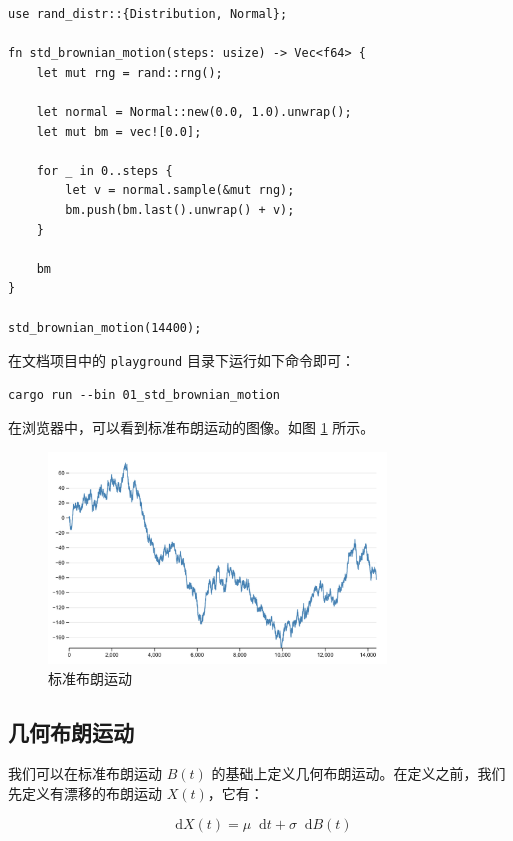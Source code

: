 \documentclass[utf8,a4paper,nofonts,9pt]{ctexbook}
\def\dif{\mathop{}\!\mathrm{d}}
\begin{document}
\begin{lstlisting}
use rand_distr::{Distribution, Normal};

fn std_brownian_motion(steps: usize) -> Vec<f64> {
    let mut rng = rand::rng();

    let normal = Normal::new(0.0, 1.0).unwrap();
    let mut bm = vec![0.0];

    for _ in 0..steps {
        let v = normal.sample(&mut rng);
        bm.push(bm.last().unwrap() + v);
    }

    bm
}

std_brownian_motion(14400);
\end{lstlisting}

在文档项目中的 \verb|playground| 目录下运行如下命令即可：

\begin{lstlisting}
cargo run --bin 01_std_brownian_motion
\end{lstlisting}

在浏览器中，可以看到标准布朗运动的图像。如图 \ref{fig:stdBrownianMotion} 所示。

\begin{figure}[h]
    \centering
    \includegraphics[width=0.8\textwidth]{src/static/00_std_brownian_motion.png}
    \caption{标准布朗运动}
    \label{fig:stdBrownianMotion}
\end{figure}

\subsection[几何布朗运动]{几何布朗运动\protect\footnotemark}

我们可以在标准布朗运动 $B(t)$ 的基础上定义几何布朗运动。在定义之前，我们先定义有漂移的布朗运动 $X(t)$，它有：

$$
\dif{X(t)} = \mu \dif{t} + \sigma \dif{B(t)}
$$
\end{document}
